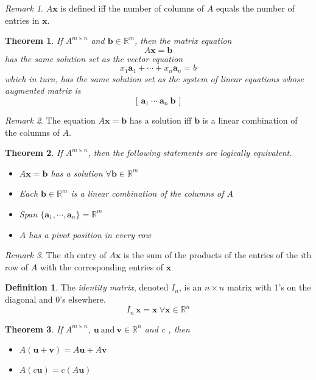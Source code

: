 \documentclass{article}
\renewcommand{\vec}[1]{\textbf{#1}}
\newtheorem{theorem}{Theorem}[section]
\theoremstyle{definition}
\newtheorem{definition}{Definition}[section]
\theoremstyle{remark}
\newtheorem*{remark}{Remark}
\theoremstyle{remark}
\theoremstyle{remark}
\newtheorem*{it follows}{It follows}
\begin{document}
\begin{remark}
  $A\vec{x}$ is defined iff the number of columns of $A$ equals the number of entries in $\vec{x}$.
\end{remark}

\begin{theorem}
  If $A^{m \times n}$ and $\vec{b} \in \mathbb{R}^m$, then the \textit{matrix equation}
  $$A\vec{x} =\vec{b}$$
  has the same solution set as the \textit{vector equation}
  $$x_1\vec{a}_1 + \cdots + x_n\vec{a}_n = b$$
  which in turn, has the same solution set as the system of linear equations whose augmented matrix is
  $$ \left[ \, \vec{a}_1\ \cdots\ \vec{a}_n\ \vec{b}  \, \right]$$
\end{theorem}

\begin{remark}
  The equation $A\vec{x} = \vec{b}$ has a solution iff $\vec{b}$ is a linear combination of the columns of $A$.
\end{remark}

\begin{theorem}
  If $A^{m \times n}$, then the following statements are logically equivalent.
  \begin{itemize}
    \item $A\vec{x}=\vec{b}$ has a solution $\forall \vec{b} \in \mathbb{R}^m$
    \item Each $\vec{b} \in \mathbb{R}^m$ is a linear combination of the columns of $A$
    \item Span $\{\vec{a}_1, \cdots, \vec{a}_n \} = \mathbb{R}^m$
    \item $A$ has a pivot position in every row
  \end{itemize}
\end{theorem}

\begin{remark}
  The \textit{i}th entry of $A\vec{x}$ is the sum of the products of the entries of the \textit{i}th row of $A$ with the corresponding entries of $\vec{x}$
\end{remark}

\begin{definition}
  The \textit{identity matrix}, denoted $I_{n}$, is an $n \times n$ matrix with 1's on the diagonal and 0's elsewhere.
  $$I_{n} \, \vec{x} = \vec{x}\ \forall \vec{x} \in \mathbb{R}^n$$
\end{definition}

\begin{theorem}
  If $A^{m \times n}$, $\vec{u}\ \text{and}\ \vec{v} \in \mathbb{R}^n$ and c \in {}, then
  \begin{itemize}
    \item $A(\vec{u} + \vec{v}) = A\vec{u} + A\vec{v}$
    \item $A(c\vec{u}) = c(A\vec{u})$
  \end{itemize}
\end{theorem}
\end{document}
